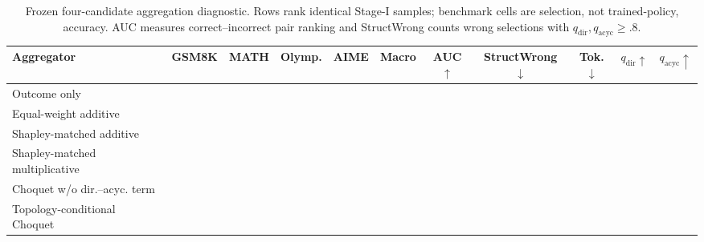 \begin{table}[!t]
\centering
\caption{Frozen four-candidate aggregation diagnostic. Rows rank identical Stage-I samples; benchmark cells are selection, not trained-policy, accuracy. AUC measures correct--incorrect pair ranking and StructWrong counts wrong selections with $q_{\mathrm{dir}},q_{\mathrm{acyc}}\geq.8$. }
\label{tab:aggregation_ablation}
\scriptsize
\setlength{\tabcolsep}{2.7pt}
\setlength{\belowcaptionskip}{2pt}
\renewcommand{\arraystretch}{0.94}
\newcommand{\pendingten}{\tbd{--} & \tbd{--} & \tbd{--} & \tbd{--} & \tbd{--} & \tbd{--} & \tbd{--} & \tbd{--} & \tbd{--} & \tbd{--}}
\begin{tabularx}{\textwidth}{@{}>{\raggedright\arraybackslash}X ccccc ccccc@{}}
\toprule
\textbf{Aggregator} & \textbf{GSM8K} & \textbf{MATH} & \textbf{Olymp.} & \textbf{AIME} & \textbf{Macro} & \textbf{AUC}$\uparrow$ & \textbf{StructWrong}$\downarrow$ & \textbf{Tok.}$\downarrow$ & $q_{\mathrm{dir}}\uparrow$ & $q_{\mathrm{acyc}}\uparrow$ \\
\midrule
Outcome only & \pendingten \\
Equal-weight additive & \pendingten \\
Shapley-matched additive & \pendingten \\
Shapley-matched multiplicative & \pendingten \\
Choquet w/o dir.--acyc. term & \pendingten \\
\rowcolor{blue!6}
Topology-conditional Choquet & \pendingten \\
\bottomrule
\end{tabularx}
\let\pendingten\relax
\end{table}

